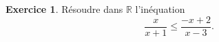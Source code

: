 \documentclass[a4paper, 11pt,openany]{article}%
\theoremstyle{plain}
\theoremstyle{definition}
\newtheorem{exo}{Exercice}
\newtheorem{sol}{Solution de l'exercice}
\theoremstyle{remark}
\newcommand{\R}{\mathbb{R}}
\begin{document}

\begin{exo}
Résoudre dans $\R$ l'inéquation
\[  \frac{x}{x+1}  \leqslant \frac{-x+2}{x-3}.\]
\end{exo}
\end{document}
